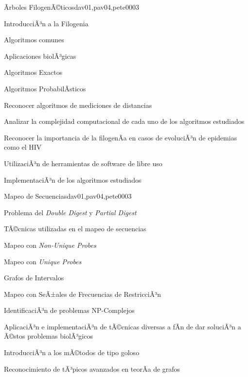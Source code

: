 \begin{syllabus}
\begin{unit}{Ãrboles FilogenÃ©ticos}{dav01,pav04,pete00}{0}{3}
\begin{topics}
        \item IntroducciÃ³n a la Filogenia
        \item Algoritmos comunes
        \item Aplicaciones biolÃ³gicas
        \item Algoritmos Exactos
        \item Algoritmos ProbabilÃ­sticos
    \end{topics}
    \begin{unitgoals}
        \item Reconocer algoritmos de mediciones de distancias
        \item Analizar la complejidad computacional de cada uno de los algoritmos estudiados
        \item Reconocer la importancia de la filogenÃ­a en casos de evoluciÃ³n de epidemias como el HIV
        \item UtilizaciÃ³n de herramientas de software de libre uso
        \item ImplementaciÃ³n de los algoritmos estudiados
    \end{unitgoals}
\end{unit}

\begin{unit}{Mapeo de Secuencias}{dav01,pav04,pete00}{0}{3}
\begin{topics}
        \item Problema del \textit{Double Digest} y \textit{Partial Digest}
        \item TÃ©cnicas utilizadas en el mapeo de secuencias
        \item Mapeo con \textit{Non-Unique Probes}
        \item Mapeo con \textit{Unique Probes}
        \item Grafos de Intervalos
        \item Mapeo con SeÃ±ales de Frecuencias de RestricciÃ³n
    \end{topics}
    \begin{unitgoals}
        \item IdentificaciÃ³n de problemas NP-Complejos
        \item AplicaciÃ³n e implementaciÃ³n de tÃ©cnicas diversas a fÃ­n de dar soluciÃ³n a Ã©stos problemas biolÃ³gicos
        \item IntroducciÃ³n a los mÃ©todos de tipo goloso
        \item Reconocimiento de tÃ³picos avanzados en teorÃ­a de grafos
    \end{unitgoals}
\end{unit}


\end{syllabus}
